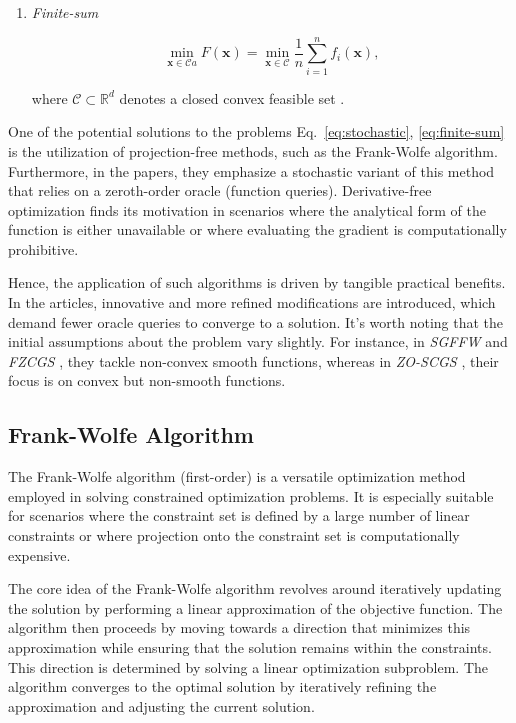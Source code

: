 \begin{multicols}{2}
\begin{enumerate}
    \item \textit{Finite-sum} 
    
    \begin{equation}
        \min _{\mathbf{x} \in \mathcal{C}a} F(\mathbf{x})= \min _{\mathbf{x} \in \mathcal{C}}\dfrac{1}{n} \sum_{i=1}^n f_i(\mathbf{x}),
        \label{eq:finite-sum}
    \end{equation}

    where $\mathcal{C} \subset \mathbb{R}^d$ denotes a closed convex feasible set \cite{gao20b}.
\end{enumerate}

One of the potential solutions to the problems Eq.~\eqref{eq:stochastic}, \eqref{eq:finite-sum} 
is the utilization of projection-free methods, such as the Frank-Wolfe algorithm. 
Furthermore, in the papers, they emphasize a stochastic variant of this method that 
relies on a zeroth-order oracle (function queries). Derivative-free optimization finds 
its motivation in scenarios where the analytical form of the function is either 
unavailable or where evaluating the gradient is computationally prohibitive.

Hence, the application of such algorithms is driven by tangible practical benefits. 
In the articles, innovative and more refined modifications are introduced, 
which demand fewer oracle queries to converge to a solution. It's worth noting 
that the initial assumptions about the problem vary slightly. For instance, 
in \textit{SGFFW} \cite{sahu19a}  and \textit{FZCGS} \cite{gao20b}, they tackle non-convex smooth
functions, whereas in \textit{ZO-SCGS} \cite{lobanov2023}, their focus is on convex but non-smooth functions.


\subsection{Frank-Wolfe Algorithm}

The Frank-Wolfe algorithm (first-order) is a versatile optimization method employed in solving 
constrained optimization problems. It is especially suitable for scenarios where 
the constraint set is defined by a large number of linear constraints or 
where projection onto the constraint set is computationally expensive.

The core idea of the Frank-Wolfe algorithm revolves around iteratively 
updating the solution by performing a linear approximation of the objective function. 
The algorithm then proceeds by moving towards a direction that minimizes 
this approximation while ensuring that the solution remains within the constraints. 
This direction is determined by solving a linear optimization subproblem. 
The algorithm converges to the optimal solution by iteratively refining 
the approximation and adjusting the current solution.


\end{multicols}
